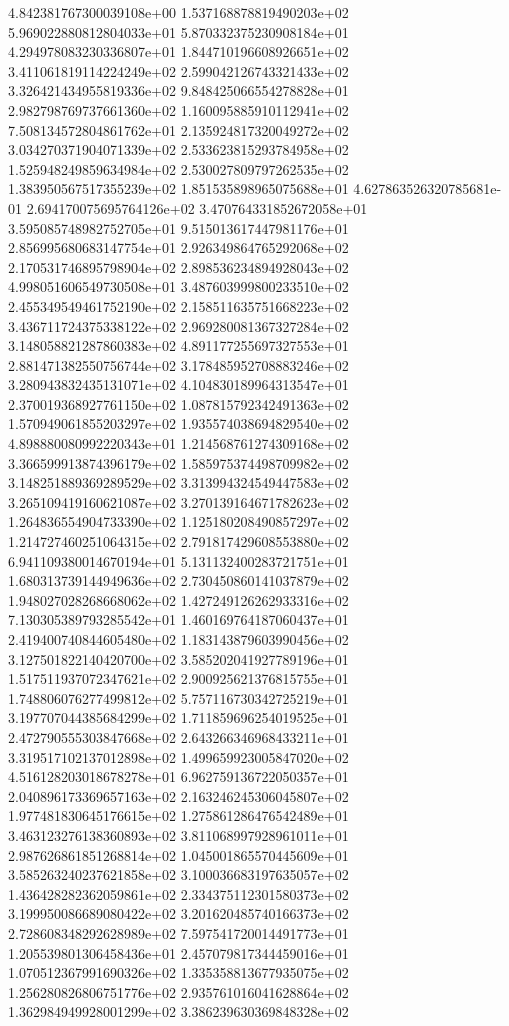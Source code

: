 4.842381767300039108e+00 1.537168878819490203e+02 5.969022880812804033e+01
5.870332375230908184e+01 4.294978083230336807e+01 1.844710196608926651e+02
3.411061819114224249e+02 2.599042126743321433e+02 3.326421434955819336e+02
9.848425066554278828e+01 2.982798769737661360e+02 1.160095885910112941e+02
7.508134572804861762e+01 2.135924817320049272e+02 3.034270371904071339e+02
2.533623815293784958e+02 1.525948249859634984e+02 2.530027809797262535e+02
1.383950567517355239e+02 1.851535898965075688e+01 4.627863526320785681e-01
2.694170075695764126e+02 3.470764331852672058e+01 3.595085748982752705e+01
9.515013617447981176e+01 2.856995680683147754e+01 2.926349864765292068e+02
2.170531746895798904e+02 2.898536234894928043e+02 4.998051606549730508e+01
3.487603999800233510e+02 2.455349549461752190e+02 2.158511635751668223e+02
3.436711724375338122e+02 2.969280081367327284e+02 3.148058821287860383e+02
4.891177255697327553e+01 2.881471382550756744e+02 3.178485952708883246e+02
3.280943832435131071e+02 4.104830189964313547e+01 2.370019368927761150e+02
1.087815792342491363e+02 1.570949061855203297e+02 1.935574038694829540e+02
4.898880080992220343e+01 1.214568761274309168e+02 3.366599913874396179e+02
1.585975374498709982e+02 3.148251889369289529e+02 3.313994324549447583e+02
3.265109419160621087e+02 3.270139164671782623e+02 1.264836554904733390e+02
1.125180208490857297e+02 1.214727460251064315e+02 2.791817429608553880e+02
6.941109380014670194e+01 5.131132400283721751e+01 1.680313739144949636e+02
2.730450860141037879e+02 1.948027028268668062e+02 1.427249126262933316e+02
7.130305389793285542e+01 1.460169764187060437e+01 2.419400740844605480e+02
1.183143879603990456e+02 3.127501822140420700e+02 3.585202041927789196e+01
1.517511937072347621e+02 2.900925621376815755e+01 1.748806076277499812e+02
5.757116730342725219e+01 3.197707044385684299e+02 1.711859696254019525e+01
2.472790555303847668e+02 2.643266346968433211e+01 3.319517102137012898e+02
1.499659923005847020e+02 4.516128203018678278e+01 6.962759136722050357e+01
2.040896173369657163e+02 2.163246245306045807e+02 1.977481830645176615e+02
1.275861286476542489e+01 3.463123276138360893e+02 3.811068997928961011e+01
2.987626861851268814e+02 1.045001865570445609e+01 3.585263240237621858e+02
3.100036683197635057e+02 1.436428282362059861e+02 2.334375112301580373e+02
3.199950086689080422e+02 3.201620485740166373e+02 2.728608348292628989e+02
7.597541720014491773e+01 1.205539801306458436e+01 2.457079817344459016e+01
1.070512367991690326e+02 1.335358813677935075e+02 1.256280826806751776e+02
2.935761016041628864e+02 1.362984949928001299e+02 3.386239630369848328e+02
